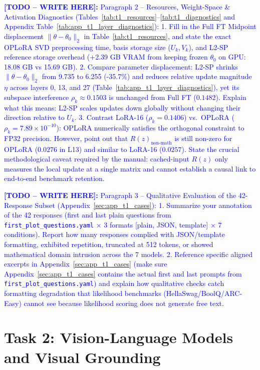\documentclass{article}
\newcommand{\writetodo}[1]{\noindent\textcolor{blue}{\textbf{[TODO -- WRITE HERE]:} #1}\par\medskip}
\begin{document}
\writetodo{Paragraph 2 -- Resources, Weight-Space \& Activation Diagnostics (Tables~\ref{tab:t1_resources}--\ref{tab:t1_diagnostics} and Appendix Table~\ref{tab:app_t1_layer_diagnostics}):
1. Fill in the Full FT Midpoint displacement $\|\theta - \theta_0\|_2$ in Table~\ref{tab:t1_resources}, and state the exact OPLoRA SVD preprocessing time, basis storage size ($U_k, V_k$), and L2-SP reference storage overhead (+2.39 GB VRAM from keeping frozen $\theta_0$ on GPU: 18.08 GB vs 15.69 GB).
2. Compare parameter displacement: L2-SP shrinks $\|\theta - \theta_0\|_2$ from 9.735 to 6.255 (-35.7\%) and reduces relative update magnitude $\eta$ across layers 0, 13, and 27 (Table~\ref{tab:app_t1_layer_diagnostics}), yet its subspace interference $\rho_k \approx 0.1503$ is unchanged from Full FT ($0.1482$). Explain what this means: L2-SP scales updates down globally without changing their direction relative to $U_k$.
3. Contrast LoRA-16 ($\rho_k = 0.1406$) vs.\ OPLoRA ($\rho_k = 7.89\times 10^{-10}$): OPLoRA numerically satisfies the orthogonal constraint to FP32 precision. However, point out that $R(z)_{\text{non-math}}$ is still non-zero for OPLoRA ($0.0276$ in L13) and similar to LoRA-16 ($0.0257$). State the crucial methodological caveat required by the manual: cached-input $R(z)$ only measures the local update at a single matrix and cannot establish a causal link to end-to-end benchmark retention.}

\writetodo{Paragraph 3 -- Qualitative Evaluation of the 42-Response Subset (Appendix~\ref{sec:app_t1_cases}):
1. Summarize your annotation of the 42 responses (first and last plain questions from \texttt{first\_plot\_questions.yaml} $\times$ 3 formats [plain, JSON, template] $\times$ 7 conditions). Report how many responses complied with JSON/template formatting, exhibited repetition, truncated at 512 tokens, or showed mathematical domain intrusion across the 7 models.
2. Reference specific aligned excerpts in Appendix~\ref{sec:app_t1_cases} (make sure Appendix~\ref{sec:app_t1_cases} contains the actual first and last prompts from \texttt{first\_plot\_questions.yaml}) and explain how qualitative checks catch formatting degradation that likelihood benchmarks (HellaSwag/BoolQ/ARC-Easy) cannot see because likelihood scoring does not generate free text.}

\section{Task 2: Vision-Language Models and Visual Grounding}
\label{sec:task2}
\end{document}
